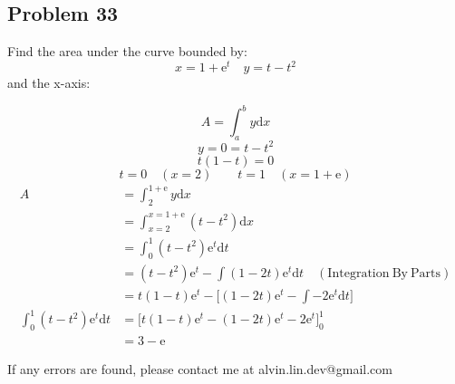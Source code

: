 \documentclass[letterpaper, 12pt]{article}
\newcommand*{\diff}{\mathrm{d}}
\newcommand*{\e}{\mathrm{e}}
\begin{document}
\subsection*{Problem 33}
Find the area under the curve bounded by:
\[ x = 1+\e^{t} \quad y = t-t^{2} \]
and the x-axis:
\begin{center}
\end{center}
\[ A = \int_{a}^{b}{y\diff{x}} \]
\[ y = 0 = t-t^{2} \]
\[ t(1-t) = 0 \]
\[ t = 0 \quad (x = 2) \quad \quad t = 1 \quad (x=1+\e) \]
\begin{align*}
  A &= \int_{2}^{1+\e}{y\diff{x}} \\
  &= \int_{x=2}^{x=1+\e}{(t-t^{2})\diff{x}} \\
  &= \int_{0}^{1}{(t-t^{2})\e^{t}\diff{t}} \\
  &= (t-t^{2})\e^{t}-\int{(1-2t)\e^{t}\diff{t}}
    \quad\mathrm{(Integration\ By\ Parts)} \\
  &= t(1-t)\e^{t}-\bigg[(1-2t)\e^{t}-\int{-2\e^{t}\diff{t}}\bigg] \\
  \int_{0}^{1}{(t-t^{2})\e^{t}\diff{t}} &=
    \bigg[t(1-t)\e^{t}-(1-2t)\e^{t}-2\e^{t}\bigg]_{0}^{1} \\
  &= 3-\e
\end{align*}

\begin{center}
  If any errors are found, please contact me at alvin.lin.dev@gmail.com
\end{center}
\end{document}

